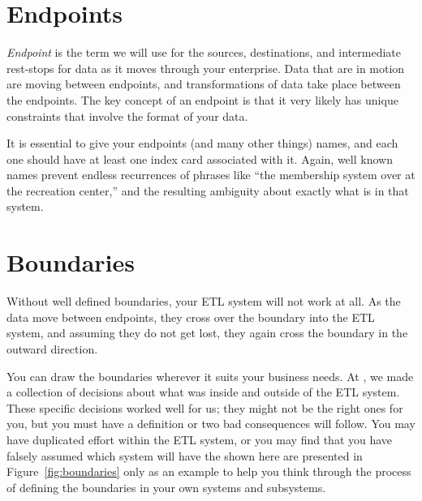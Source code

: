 \documentclass[11pt,letterpaper,twosided]{memoir}
\begin{document}
\section{Endpoints}

\emph{Endpoint} is the term we will use for the sources, destinations,
and intermediate rest-stops for data as it moves through your
enterprise. Data that are in motion are moving between endpoints,
and transformations of data take place between the endpoints. The
key concept of an endpoint is that it very likely has unique
constraints that involve the format of your data.

It is essential to give your endpoints (and many other things)
names, and each one should have at least one index card associated
with it. Again, well known names prevent endless recurrences of
phrases like ``the membership system over at the recreation center,''
and the resulting ambiguity about exactly what is in that system.

\section{Boundaries}

Without well defined boundaries, your ETL system will not work at
all. As the data move between endpoints, they cross over the boundary
into the ETL system, and assuming they do not get lost, they again
cross the boundary in the outward direction.

You can draw the boundaries wherever it suits your business needs.
At \UR, we made a collection of decisions about what was inside and
outside of the ETL system. These specific decisions worked well for
us; they might not be the right ones for you, but you must have a
definition or two bad consequences will follow.  You may have
duplicated effort within the ETL system, or you may find that you
have falsely assumed which system will have the shown here are
presented in Figure~\ref{fig:boundaries} only as an example to help
you think through the process of defining the boundaries in your
own systems and subsystems.
\end{document}
